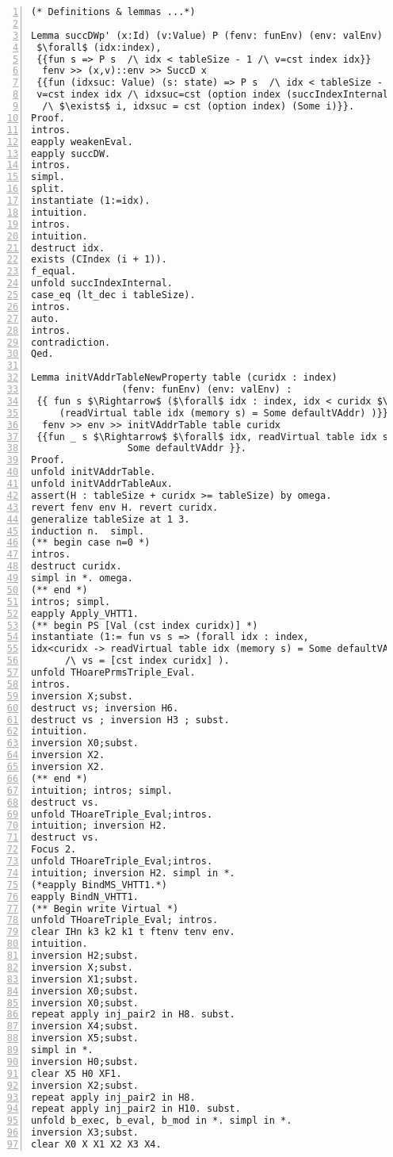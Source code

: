 \begin{appendices}
\begin{lstlisting}[xleftmargin=-.1\textwidth,
xrightmargin=-.1\textwidth,
mathescape=true,numbers=left]
(* Definitions & lemmas ...*)

Lemma succDWp' (x:Id) (v:Value) P (fenv: funEnv) (env: valEnv) :
 $\forall$ (idx:index), 
 {{fun s => P s  /\ idx < tableSize - 1 /\ v=cst index idx}} 
  fenv >> (x,v)::env >> SuccD x 
 {{fun (idxsuc: Value) (s: state) => P s  /\ idx < tableSize - 1 /\ 
 v=cst index idx /\ idxsuc=cst (option index (succIndexInternal idx) 
  /\ $\exists$ i, idxsuc = cst (option index) (Some i)}}.
Proof.
intros.
eapply weakenEval.
eapply succDW.
intros. 
simpl. 
split.
instantiate (1:=idx).  
intuition.
intros.
intuition.
destruct idx.
exists (CIndex (i + 1)).
f_equal.
unfold succIndexInternal.
case_eq (lt_dec i tableSize).
intros.
auto.
intros.
contradiction.
Qed.

Lemma initVAddrTableNewProperty table (curidx : index) 
                (fenv: funEnv) (env: valEnv) :
 {{ fun s $\Rightarrow$ ($\forall$ idx : index, idx < curidx $\rightarrow$ 
     (readVirtual table idx (memory s) = Some defaultVAddr) )}} 
  fenv >> env >> initVAddrTable table curidx 
 {{fun _ s $\Rightarrow$ $\forall$ idx, readVirtual table idx s.(memory) = 
 	             Some defaultVAddr }}. 
Proof.
unfold initVAddrTable.
unfold initVAddrTableAux.
assert(H : tableSize + curidx >= tableSize) by omega.
revert fenv env H. revert curidx.
generalize tableSize at 1 3. 
induction n.  simpl. 
(** begin case n=0 *)
intros.
destruct curidx.
simpl in *. omega.
(** end *)
intros; simpl.
eapply Apply_VHTT1.
(** begin PS [Val (cst index curidx)] *)
instantiate (1:= fun vs s => (forall idx : index,
idx<curidx -> readVirtual table idx (memory s) = Some defaultVAddr) 
      /\ vs = [cst index curidx] ).
unfold THoarePrmsTriple_Eval.
intros.
inversion X;subst.
destruct vs; inversion H6.
destruct vs ; inversion H3 ; subst.
intuition.
inversion X0;subst.
inversion X2.
inversion X2.
(** end *)
intuition; intros; simpl.
destruct vs.
unfold THoareTriple_Eval;intros.
intuition; inversion H2.
destruct vs.
Focus 2.
unfold THoareTriple_Eval;intros.
intuition; inversion H2. simpl in *.
(*eapply BindMS_VHTT1.*)
eapply BindN_VHTT1.
(** Begin write Virtual *)
unfold THoareTriple_Eval; intros.
clear IHn k3 k2 k1 t ftenv tenv env.
intuition.
inversion H2;subst.
inversion X;subst.
inversion X1;subst.
inversion X0;subst.
inversion X0;subst.
repeat apply inj_pair2 in H8. subst.
inversion X4;subst.
inversion X5;subst.
simpl in *.
inversion H0;subst.
clear X5 H0 XF1.
inversion X2;subst.
repeat apply inj_pair2 in H8.
repeat apply inj_pair2 in H10. subst.
unfold b_exec, b_eval, b_mod in *. simpl in *.
inversion X3;subst.
clear X0 X X1 X2 X3 X4.

\end{lstlisting}
\end{appendices}
